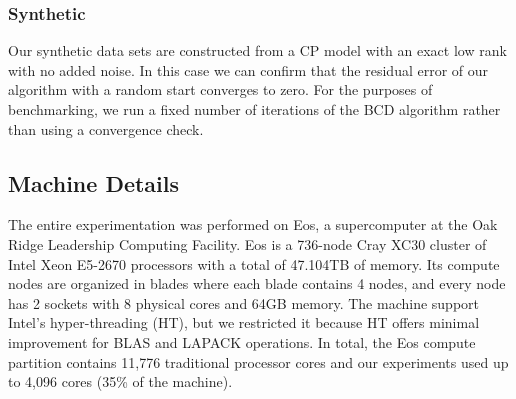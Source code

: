 \subsubsection{Synthetic}
Our synthetic data sets are constructed from a CP model with an exact low rank with no added noise.
In this case we can confirm that the residual error of our algorithm with a random start converges to zero.
For the purposes of benchmarking, we run a fixed number of iterations of the BCD algorithm rather than using a convergence check.


\subsection{Machine Details}


The entire experimentation was performed on Eos, a supercomputer at the Oak Ridge Leadership Computing Facility. 
Eos is a 736-node Cray XC30 cluster of Intel Xeon E5-2670 processors with a total of 47.104TB of memory. 
Its compute nodes are organized in blades where each blade contains 4 nodes, and every node has 2 sockets with 8 physical cores and 64GB memory. 
The machine support Intel's hyper-threading (HT), but we restricted it because HT offers minimal improvement for BLAS and LAPACK operations. 
In total, the Eos compute partition contains 11,776 traditional processor cores and our experiments used up to 4,096 cores (35\% of the machine). 

